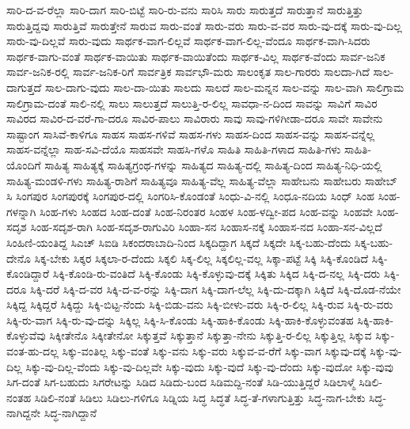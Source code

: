 {ಸಾರಿ-ದ-ವ-ರೆಲ್ಲಾ
ಸಾರಿ-ದಾಗ
ಸಾರಿ-ಬಿಟ್ಟೆ
ಸಾರಿ-ರು-ವನು
ಸಾರಿಸಿ
ಸಾರು
ಸಾರುತ್ತದೆ
ಸಾರುತ್ತಾನೆ
ಸಾರುತ್ತಿತ್ತು
ಸಾರುತ್ತಿದ್ದವು
ಸಾರುತ್ತಿವೆ
ಸಾರುತ್ತೇನೆ
ಸಾರುವ
ಸಾರು-ವಂತೆ
ಸಾರು-ವರು
ಸಾರು-ವ-ವರ
ಸಾರು-ವು-ದಕ್ಕೆ
ಸಾರು-ವು-ದಿಲ್ಲ
ಸಾರು-ವು-ದಿಲ್ಲವೆ
ಸಾರು-ವುದು
ಸಾರ್ಥಕ-ವಾಗ-ಲಿಲ್ಲವೆ
ಸಾರ್ಥಕ-ವಾಗ-ಲಿಲ್ಲ-ವೆಂದೂ
ಸಾರ್ಥಕ-ವಾಗಿ-ಸಿದರು
ಸಾರ್ಥಕ-ವಾಗು-ವಂತೆ
ಸಾರ್ಥಕ-ವಾಯಿತು
ಸಾರ್ಥಕ-ವಾಯಿತೆಂದು
ಸಾರ್ಥಕ-ವಿಲ್ಲ
ಸಾರ್ಥಕ-ವೆಂದು
ಸಾರ್ವ-ಜನಿಕ
ಸಾರ್ವ-ಜನಿಕ-ರಲ್ಲಿ
ಸಾರ್ವ-ಜನಿಕ-ರಿಗೆ
ಸಾರ್ವತ್ರಿಕ
ಸಾರ್ವಭೌ-ಮರು
ಸಾಲಂಕೃತ
ಸಾಲ-ಗಾರರು
ಸಾಲದಾ-ಗಿದೆ
ಸಾಲ-ದಾಗುತ್ತದೆ
ಸಾಲ-ದಾಗು-ವುದು
ಸಾಲ-ದಾ-ಯಿತು
ಸಾಲದು
ಸಾಲದೆ
ಸಾಲ-ಮನ್ನನ
ಸಾಲ-ವನ್ನು
ಸಾಲ-ವಾಗಿ
ಸಾಲಿಗ್ರಾಮ
ಸಾಲಿಗ್ರಾಮ-ದಂತೆ
ಸಾಲಿ-ನಲ್ಲಿ
ಸಾಲು
ಸಾಲುತ್ತದೆ
ಸಾಲುತ್ತಿ-ರ-ಲಿಲ್ಲ
ಸಾವಧಾ-ನ-ದಿಂದ
ಸಾವನ್ನು
ಸಾವಿಗೆ
ಸಾವಿರ
ಸಾವಿರದ
ಸಾವಿರ-ದ-ವರೆ-ಗಾ-ದರೂ
ಸಾವಿರ-ಪಾಲು
ಸಾವಿರಾರು
ಸಾವು
ಸಾವು-ಗಳಿಗೀಡಾ-ದರೂ
ಸಾವೇ
ಸಾವೇನು
ಸಾಷ್ಟಾಂಗ
ಸಾಸಿವೆ-ಕಾಳಿಗೂ
ಸಾಹಸ
ಸಾಹಸ-ಗಳಿವೆ
ಸಾಹಸ-ಗಳು
ಸಾಹಸ-ದಿಂದ
ಸಾಹಸ-ವನ್ನು
ಸಾಹಸ-ವನ್ನೆಲ್ಲ
ಸಾಹಸ-ವನ್ನೆಲ್ಲಾ
ಸಾಹ-ಸವಿ-ದೆಯೊ
ಸಾಹಸವೇ
ಸಾಹಸಿ-ಗಳೊ
ಸಾಹಿತಿ
ಸಾಹಿತಿ-ಗಳಾದ
ಸಾಹಿತಿ-ಗಳು
ಸಾಹಿತಿ-ಯೊಂದಿಗೆ
ಸಾಹಿತ್ಯ
ಸಾಹಿತ್ಯಕ್ಕೆ
ಸಾಹಿತ್ಯಗ್ರಂಥ-ಗಳನ್ನು
ಸಾಹಿತ್ಯದ
ಸಾಹಿತ್ಯ-ದಲ್ಲಿ
ಸಾಹಿತ್ಯ-ದಿಂದ
ಸಾಹಿತ್ಯ-ನಿಧಿ-ಯಲ್ಲಿ
ಸಾಹಿತ್ಯ-ಮಂಡಳಿ-ಗಳು
ಸಾಹಿತ್ಯ-ರಾಶಿಗೆ
ಸಾಹಿತ್ಯವೂ
ಸಾಹಿತ್ಯ-ವೆಲ್ಲ
ಸಾಹಿತ್ಯ-ವೆಲ್ಲಾ
ಸಾಹೇಬನು
ಸಾಹೇಬರು
ಸಾಹೇಬ್
ಸಿ
ಸಿಂಗಪುರ
ಸಿಂಗಪುರಕ್ಕೆ
ಸಿಂಗಪುರ-ದಲ್ಲಿ
ಸಿಂಗರಿಸಿ-ಕೊಂಡಂತೆ
ಸಿಂಧು-ವಿ-ನಲ್ಲಿ
ಸಿಂಧೂ-ನದಿಯ
ಸಿಂಧ್
ಸಿಂಹ
ಸಿಂಹ-ಗಳನ್ನಾಗಿ
ಸಿಂಹ-ಗಳು
ಸಿಂಹದ
ಸಿಂಹ-ದಂತೆ
ಸಿಂಹ-ನಿರಂತರ
ಸಿಂಹಳ
ಸಿಂಹ-ಳದ್ವೀ-ಪದ
ಸಿಂಹ-ವನ್ನು
ಸಿಂಹವೇ
ಸಿಂಹ-ಸದೃಶ
ಸಿಂಹ-ಸದೃಶ-ರಾಗಿ
ಸಿಂಹ-ಸದೃಶ-ರಾಗುವಿರಿ
ಸಿಂಹಾ-ಸನ
ಸಿಂಹಾಸ-ನಕ್ಕೆ
ಸಿಂಹಾಸ-ನದ
ಸಿಂಹಾ-ಸನ-ವಿಲ್ಲದೆ
ಸಿಂಹಿಣಿ-ಯಂತಿದ್ದ
ಸಿಎಚ್
ಸಿಐಡಿ
ಸಿಕಂದರಾಬಾದಿ-ನಿಂದ
ಸಿಕ್ಕದಿದ್ದಾಗ
ಸಿಕ್ಕದೆ
ಸಿಕ್ಕದೇ
ಸಿಕ್ಕ-ಬಹು-ದೆಂದು
ಸಿಕ್ಕ-ಬಹು-ದೇನೊ
ಸಿಕ್ಕ-ಬೇಕು
ಸಿಕ್ಕರ
ಸಿಕ್ಕಲಾ-ರ-ದೆಂದು
ಸಿಕ್ಕಲಿ
ಸಿಕ್ಕ-ಲಿಲ್ಲ
ಸಿಕ್ಕಲಿಲ್ಲ-ವಲ್ಲ
ಸಿಕ್ಕಾ-ಪಟ್ಟೆ
ಸಿಕ್ಕಿ
ಸಿಕ್ಕಿ-ಕೊಂಡಿದೆ
ಸಿಕ್ಕಿ-ಕೊಂಡಿದ್ದಾರೆ
ಸಿಕ್ಕಿ-ಕೊಂಡಿ-ರು-ವಂತಿದೆ
ಸಿಕ್ಕಿ-ಕೊಂಡು
ಸಿಕ್ಕಿ-ಕೊಳ್ಳುವು-ದಕ್ಕೆ
ಸಿಕ್ಕಿತು
ಸಿಕ್ಕಿದ
ಸಿಕ್ಕಿ-ದ-ನಲ್ಲ
ಸಿಕ್ಕಿ-ದರು
ಸಿಕ್ಕಿ-ದರೂ
ಸಿಕ್ಕಿ-ದರೆ
ಸಿಕ್ಕಿ-ದ-ವರ
ಸಿಕ್ಕಿ-ದ-ವ-ರನ್ನು
ಸಿಕ್ಕಿ-ದಾಗ
ಸಿಕ್ಕಿ-ದಾಗ-ಲೆಲ್ಲ
ಸಿಕ್ಕಿ-ದು-ದಕ್ಕಾಗಿ
ಸಿಕ್ಕಿದೆ
ಸಿಕ್ಕಿ-ದೊಡ-ನೆಯೇ
ಸಿಕ್ಕಿದ್ದ
ಸಿಕ್ಕಿದ್ದರೆ
ಸಿಕ್ಕಿದ್ದು
ಸಿಕ್ಕಿ-ಬಿಟ್ಟ-ನೆಂದು
ಸಿಕ್ಕಿ-ಬಿಡು-ವನು
ಸಿಕ್ಕಿ-ಬೀಳು-ವರು
ಸಿಕ್ಕಿ-ರ-ಲಿಲ್ಲ
ಸಿಕ್ಕಿ-ರುವ
ಸಿಕ್ಕಿ-ರು-ವರು
ಸಿಕ್ಕಿ-ರು-ವಾಗ
ಸಿಕ್ಕಿ-ರು-ವು-ದನ್ನು
ಸಿಕ್ಕಿಲ್ಲ
ಸಿಕ್ಕಿ-ಸಿ-ಕೊಂಡು
ಸಿಕ್ಕಿ-ಹಾಕಿ-ಕೊಂಡು
ಸಿಕ್ಕಿ-ಹಾಕಿ-ಕೊಳ್ಳುವಂತಹ
ಸಿಕ್ಕಿ-ಹಾಕಿ-ಕೊಳ್ಳುವೆವು
ಸಿಕ್ಕೀತೇನೊ
ಸಿಕ್ಕೀತೇನೋ
ಸಿಕ್ಕುತ್ತವೆ
ಸಿಕ್ಕುತ್ತಾನೆ
ಸಿಕ್ಕುತ್ತಾ-ನೇನು
ಸಿಕ್ಕುತ್ತಿ-ರ-ಲಿಲ್ಲ
ಸಿಕ್ಕುತ್ತಿಲ್ಲ
ಸಿಕ್ಕುವ
ಸಿಕ್ಕು-ವಂತ-ಹು-ದಲ್ಲ
ಸಿಕ್ಕು-ವಂತಿಲ್ಲ
ಸಿಕ್ಕು-ವಂತೆ
ಸಿಕ್ಕು-ವನು
ಸಿಕ್ಕು-ವರು
ಸಿಕ್ಕುವ-ವ-ರೆಗೆ
ಸಿಕ್ಕು-ವಾಗ
ಸಿಕ್ಕುವು-ದಕ್ಕೆ
ಸಿಕ್ಕು-ವು-ದಿಲ್ಲ
ಸಿಕ್ಕು-ವು-ದಿಲ್ಲ-ವೆಂದು
ಸಿಕ್ಕು-ವು-ದಿಲ್ಲವೇ
ಸಿಕ್ಕು-ವುದು
ಸಿಕ್ಕು-ವುದೆ
ಸಿಕ್ಕು-ವು-ದೆಂದು
ಸಿಕ್ಕು-ವುದೋ
ಸಿಕ್ಕು-ವುವು
ಸಿಗ-ದಂತೆ
ಸಿಗ-ಬಹುದು
ಸಿಗರೇಟನ್ನು
ಸಿಡಿದ
ಸಿಡಿದು-ಬಂದ
ಸಿಡಿಮದ್ದಿ-ನಂತೆ
ಸಿಡಿ-ಯುತ್ತಿದ್ದರೆ
ಸಿಡಿಲಾಳ್ಮೆ
ಸಿಡಿಲಿ-ನಂತಹ
ಸಿಡಿಲಿ-ನಂತೆ
ಸಿಡಿಲು
ಸಿಡಿಲು-ಗಳಿಗೂ
ಸಿಡ್ನಿಯ
ಸಿದ್ಧ
ಸಿದ್ಧತೆ
ಸಿದ್ಧ-ತೆ-ಗಳಾಗುತ್ತಿತ್ತು
ಸಿದ್ಧ-ನಾಗ-ಬೇಕು
ಸಿದ್ಧ-ನಾಗಿದ್ದನೇ
ಸಿದ್ಧ-ನಾಗಿದ್ದಾನೆ
}
